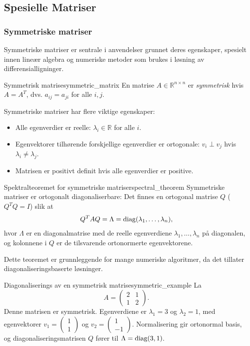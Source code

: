\documentclass[../../main.tex]{subfiles}
\begin{document}
\subsection{Spesielle Matriser}
\subsubsection{Symmetriske matriser}
Symmetriske matriser er sentrale i anvendelser grunnet deres egenskaper, spesielt innen lineær algebra og numeriske metoder som brukes i løsning av differensialligninger.

\begin{definition}{Symmetrisk matrise}{symmetric_matrix}
    En matrise $A \in \mathbb{R}^{n \times n}$ er \emph{symmetrisk} hvis $A = A^T$, dvs. $a_{ij} = a_{ji}$ for alle $i,j$.
\end{definition}

Symmetriske matriser har flere viktige egenskaper:
\begin{itemize}
    \item Alle egenverdier er reelle: $\lambda_i \in \mathbb{R}$ for alle $i$.
    \item Egenvektorer tilhørende forskjellige egenverdier er ortogonale: $v_i \perp v_j$ hvis $\lambda_i \neq \lambda_j$.
    \item Matrisen er positivt definit hvis alle egenverdier er positive.
\end{itemize}

\begin{theorem}{Spektralteoremet for symmetriske matriser}{spectral_theorem}
    Symmetriske matriser er ortogonalt diagonaliserbare: Det finnes en ortogonal matrise $Q$ ($Q^T Q = I$) slik at
    \[
        Q^T A Q = \Lambda = \operatorname{diag}(\lambda_1, \dots, \lambda_n),
    \]
    hvor $\Lambda$ er en diagonalmatrise med de reelle egenverdiene $\lambda_1, \dots, \lambda_n$ på diagonalen, og kolonnene i $Q$ er de tilsvarende ortonormerte egenvektorene.
\end{theorem}

Dette teoremet er grunnleggende for mange numeriske algoritmer, da det tillater diagonaliseringsbaserte løsninger.

\begin{example}{Diagonaliserings av en symmetrisk matrise}{symmetric_example}
    La
    \[
        A = \begin{pmatrix} 2 & 1 \\ 1 & 2 \end{pmatrix}.
    \]
    Denne matrisen er symmetrisk. Egenverdiene er $\lambda_1 = 3$ og $\lambda_2 = 1$, med egenvektorer $v_1 = \begin{pmatrix} 1 \\ 1 \end{pmatrix}$ og $v_2 = \begin{pmatrix} 1 \\ -1 \end{pmatrix}$. Normalisering gir ortonormal basis, og diagonaliseringsmatrisen $Q$ fører til $\Lambda = \operatorname{diag}(3, 1)$.
\end{example}
\end{document}
